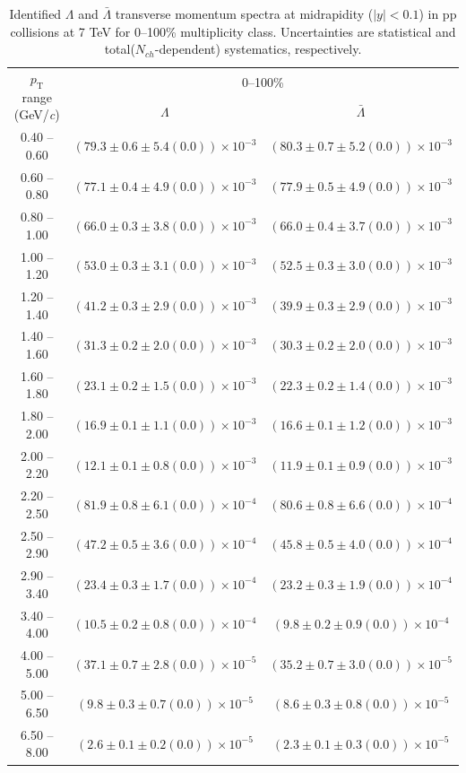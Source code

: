 \clearpage
\begin{table}
\caption{Identified $\Lambda$ and $\bar{\Lambda}$  transverse momentum spectra at midrapidity ($|y|<0.1$) in pp collisions at 7 TeV for 0--100\% multiplicity class. Uncertainties are statistical and total($N_{ch}$-dependent) systematics, respectively.}
\label{tab:Lambda_AntiLambda_0to100}
\begin{center}
\begin{tabular}{ c | c c }
\hline
\multirow{2}{*}{$p_{\mathrm{T}}$ range (GeV/\textit{c})} & \multicolumn{2}{c}{0--100\%} \\ & $\Lambda$& $\bar{\Lambda}$\\ 
\hline
0.40 -- 0.60 & $(79.3\pm0.6\pm5.4(0.0))\times10^{-3}$ & $(80.3\pm0.7\pm5.2(0.0))\times10^{-3}$ \\ 
0.60 -- 0.80 & $(77.1\pm0.4\pm4.9(0.0))\times10^{-3}$ & $(77.9\pm0.5\pm4.9(0.0))\times10^{-3}$ \\ 
0.80 -- 1.00 & $(66.0\pm0.3\pm3.8(0.0))\times10^{-3}$ & $(66.0\pm0.4\pm3.7(0.0))\times10^{-3}$ \\ 
1.00 -- 1.20 & $(53.0\pm0.3\pm3.1(0.0))\times10^{-3}$ & $(52.5\pm0.3\pm3.0(0.0))\times10^{-3}$ \\ 
1.20 -- 1.40 & $(41.2\pm0.3\pm2.9(0.0))\times10^{-3}$ & $(39.9\pm0.3\pm2.9(0.0))\times10^{-3}$ \\ 
1.40 -- 1.60 & $(31.3\pm0.2\pm2.0(0.0))\times10^{-3}$ & $(30.3\pm0.2\pm2.0(0.0))\times10^{-3}$ \\ 
1.60 -- 1.80 & $(23.1\pm0.2\pm1.5(0.0))\times10^{-3}$ & $(22.3\pm0.2\pm1.4(0.0))\times10^{-3}$ \\ 
1.80 -- 2.00 & $(16.9\pm0.1\pm1.1(0.0))\times10^{-3}$ & $(16.6\pm0.1\pm1.2(0.0))\times10^{-3}$ \\ 
2.00 -- 2.20 & $(12.1\pm0.1\pm0.8(0.0))\times10^{-3}$ & $(11.9\pm0.1\pm0.9(0.0))\times10^{-3}$ \\ 
2.20 -- 2.50 & $(81.9\pm0.8\pm6.1(0.0))\times10^{-4}$ & $(80.6\pm0.8\pm6.6(0.0))\times10^{-4}$ \\ 
2.50 -- 2.90 & $(47.2\pm0.5\pm3.6(0.0))\times10^{-4}$ & $(45.8\pm0.5\pm4.0(0.0))\times10^{-4}$ \\ 
2.90 -- 3.40 & $(23.4\pm0.3\pm1.7(0.0))\times10^{-4}$ & $(23.2\pm0.3\pm1.9(0.0))\times10^{-4}$ \\ 
3.40 -- 4.00 & $(10.5\pm0.2\pm0.8(0.0))\times10^{-4}$ & $(9.8\pm0.2\pm0.9(0.0))\times10^{-4}$ \\ 
4.00 -- 5.00 & $(37.1\pm0.7\pm2.8(0.0))\times10^{-5}$ & $(35.2\pm0.7\pm3.0(0.0))\times10^{-5}$ \\ 
5.00 -- 6.50 & $(9.8\pm0.3\pm0.7(0.0))\times10^{-5}$ & $(8.6\pm0.3\pm0.8(0.0))\times10^{-5}$ \\ 
6.50 -- 8.00 & $(2.6\pm0.1\pm0.2(0.0))\times10^{-5}$ & $(2.3\pm0.1\pm0.3(0.0))\times10^{-5}$ \\ 
\hline
\end{tabular}
\end{center}
\end{table}
 
